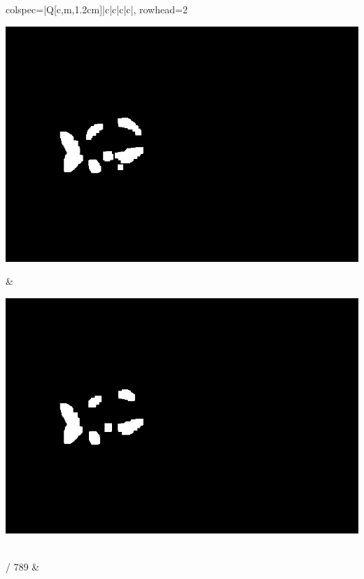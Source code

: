 \begin{longtblr}[
            caption = {Hasil uji coba proses \textit{background subtraction} menggunakan GMM yang disempurnakan oleh Operasi Morfologi},
            label = {tab:gmm_morph_9908}
        ]{
            colspec={|Q[c,m,1.2cm]|c|c|c|c|},
            rowhead=2
        }
\begin{minipage}{0.19\textwidth}
                \includegraphics[width=\linewidth]{image/9866/9866_dilated_5x11_frame509.jpg}
            \end{minipage} & 
            \begin{minipage}{0.19\textwidth}
                \includegraphics[width=\linewidth]{image/9866/9866_dilated_7x13_frame509.jpg}
            \end{minipage} \\
             / 789 &
            \begin{minipage}{0.19\textwidth}

\end{minipage}
\end{longtblr}
